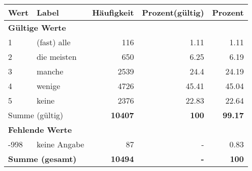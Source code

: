      \begin{longtable}{lXrrr}
     \toprule
     \textbf{Wert} & \textbf{Label} & \textbf{Häufigkeit} & \textbf{Prozent(gültig)} & \textbf{Prozent} \\
     \endhead
     \midrule
     \multicolumn{5}{l}{\textbf{Gültige Werte}}\\

     1 &
     \multicolumn{1}{X}{ (fast) alle   } &


       \num{116} &
       \num[round-mode=places,round-precision=2]{1,11} &
         \num[round-mode=places,round-precision=2]{1,11} \\

     2 &
     \multicolumn{1}{X}{ die meisten   } &


       \num{650} &
       \num[round-mode=places,round-precision=2]{6,25} &
         \num[round-mode=places,round-precision=2]{6,19} \\

     3 &
     \multicolumn{1}{X}{ manche   } &


       \num{2539} &
       \num[round-mode=places,round-precision=2]{24,4} &
         \num[round-mode=places,round-precision=2]{24,19} \\

     4 &
     \multicolumn{1}{X}{ wenige   } &


       \num{4726} &
       \num[round-mode=places,round-precision=2]{45,41} &
         \num[round-mode=places,round-precision=2]{45,04} \\

     5 &
     \multicolumn{1}{X}{ keine   } &


       \num{2376} &
       \num[round-mode=places,round-precision=2]{22,83} &
         \num[round-mode=places,round-precision=2]{22,64} \\
     \midrule
     \multicolumn{2}{l}{Summe (gültig)} &
       \textbf{\num{10407}} &
     \textbf{100} &
       \textbf{\num[round-mode=places,round-precision=2]{99,17}} \\
     \multicolumn{5}{l}{\textbf{Fehlende Werte}}\\
       -998 &
       keine Angabe &
         \num{87} &
        - &
         \num[round-mode=places,round-precision=2]{0,83} \\
     \midrule
     \multicolumn{2}{l}{\textbf{Summe (gesamt)}} &
          \textbf{\num{10494}} &
        \textbf{-} &
        \textbf{100} \\
     \bottomrule
     \end{longtable}
     
